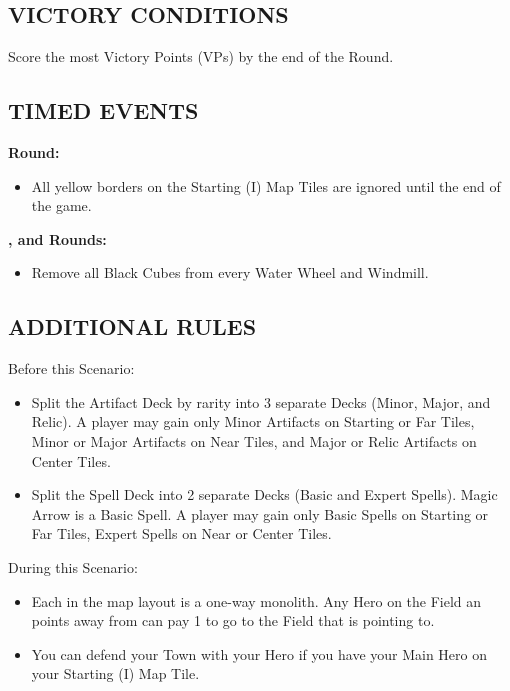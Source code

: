 \begin{multicols}{2}
\subsection*{\MakeUppercase{Victory Conditions}}
Score the most Victory Points (VPs) by the end of the  Round.

\subsection*{\MakeUppercase{Timed Events}}

\textbf{ Round:}
\begin{itemize}
  \item All yellow borders on the Starting (I) Map Tiles are ignored until the end of the game.
\end{itemize}
\textbf{,  and  Rounds:}
\begin{itemize}
  \item Remove all Black Cubes from every Water Wheel and Windmill.
\end{itemize}

\subsection*{\MakeUppercase{Additional Rules}}
Before this Scenario:

\begin{itemize}
  \item Split the Artifact Deck by rarity into 3 separate Decks (Minor, Major, and Relic).
    A player may gain only Minor Artifacts on Starting or Far Tiles, Minor or Major Artifacts on Near Tiles, and Major or Relic Artifacts on Center Tiles.
  \item Split the Spell Deck into 2 separate Decks (Basic and Expert Spells). Magic Arrow is a Basic Spell.
    A player may gain only Basic Spells on Starting or Far Tiles, Expert Spells on Near or Center Tiles.
\end{itemize}

During this Scenario:

\begin{itemize}
  \item Each  in the map layout is a one-way monolith.
    Any Hero on the Field an  points away from can pay 1  to go to the Field that  is pointing to.
  \item You can defend your Town with your Hero if you have your Main Hero on your Starting (I) Map Tile.
\end{itemize}


\end{multicols}
